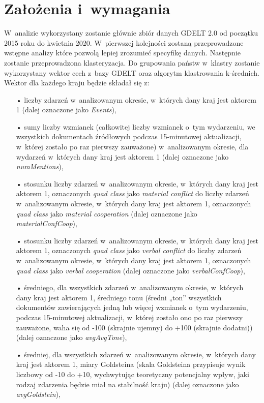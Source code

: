 \documentclass[11pt]{report}
\begin{document}
    \section{Założenia i~wymagania}\label{sec:założenia-i-wymagania}
    W~analizie wykorzystany zostanie głównie zbiór danych GDELT 2.0 od początku 2015 roku do kwietnia 2020.
    W~pierwszej kolejności zostaną przeprowadzone wstępne analizy które pozwolą lepiej zrozumieć specyfikę danych.
    Następnie zostanie przeprowadzona klasteryzacja.
    Do grupowania państw w~klastry zostanie wykorzystany wektor cech z~bazy GDELT oraz algorytm klastrowania k-średnich.
    Wektor dla każdego kraju będzie składał się z:
    \begin{enumerate}
        \item[•] liczby zdarzeń w~analizowanym okresie, w~których dany kraj jest aktorem 1 (dalej oznaczone jako \textit{Events}),
        \item[•] sumy liczby wzmianek (całkowitej liczby wzmianek o~tym wydarzeniu, we wszystkich dokumentach źródłowych podczas 15-minutowej aktualizacji, w~której zostało po raz pierwszy zauważone) w~analizowanym okresie, dla wydarzeń w~których dany kraj jest aktorem 1 (dalej oznaczone jako \textit{numMentions}),
        \item[•] stosunku liczby zdarzeń w~analizowanym okresie, w~których dany kraj jest aktorem 1, oznaczonych \textit{quad class} jako \textit{material conflict} do liczby zdarzeń w~analizowanym okresie, w~których dany kraj jest aktorem 1, oznaczonych \textit{quad class} jako \textit{material cooperation} (dalej oznaczone jako \textit{materialConfCoop}),
        \item[•] stosunku liczby zdarzeń w~analizowanym okresie, w~których dany kraj jest aktorem 1, oznaczonych \textit{quad class} jako \textit{verbal conflict} do liczby zdarzeń w~analizowanym okresie, w~których dany kraj jest aktorem 1, oznaczonych \textit{quad class} jako \textit{verbal cooperation} (dalej oznaczone jako \textit{verbalConfCoop}),
        \item[•] średniego, dla wszystkich zdarzeń w~analizowanym okresie, w~których dany kraj jest aktorem 1, średniego tonu (średni „ton” wszystkich dokumentów zawierających jedną lub więcej wzmianek o~tym wydarzeniu, podczas 15-minutowej aktualizacji, w~której zostało ono po raz pierwszy zauważone, waha się od -100 (skrajnie ujemny) do +100 (skrajnie dodatni)) (dalej oznaczone jako \textit{avgAvgTone}),
        \item[•] średniej, dla wszystkich zdarzeń w~analizowanym okresie, w~których dany kraj jest aktorem 1, miary Goldsteina (skala Goldsteina przypisuje wynik liczbowy od -10 do +10, wychwytując teoretyczny potencjalny wpływ, jaki rodzaj zdarzenia będzie miał na stabilność kraju) (dalej oznaczone jako \textit{avgGoldstein}),

\end{enumerate}
\end{document}
